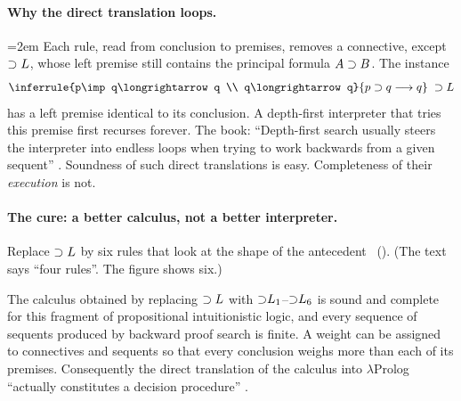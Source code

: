 \paragraph{Why the direct translation loops.}
{\emergencystretch=2em Each rule, read from conclusion to premises, removes a connective, except $\supset L$, whose left premise
still contains the principal formula $A\supset B$. The instance
\[
  \inferrule{p\imp q\longrightarrow q \\ q\longrightarrow q}{p\imp q\longrightarrow q}\;\imp L
\]
has a left premise identical to its conclusion. A depth-first interpreter that tries this premise first
recurses forever. The book: ``Depth-first search usually steers the interpreter into endless loops when
trying to work backwards from a given sequent'' . Soundness of such direct translations is
easy. Completeness of their \emph{execution} is not.\par}

\paragraph{The cure: a better calculus, not a better interpreter.}
Replace $\supset L$ by six rules that look at the shape of the antecedent~\cite{Dyckhoff1992,Hudelmaier1992}
(). (The text says ``four rules''. The figure shows six.)

\begin{fullwidth}
\end{fullwidth}

\begin{theorem}\label{thm:apps-dyckhoff}
The calculus obtained by replacing $\supset L$ with ${\supset}L_1$--${\supset}L_6$ is sound and complete for this
fragment of propositional intuitionistic logic, and every sequence of sequents produced by backward proof
search is finite. A weight can be assigned to connectives and sequents so that every conclusion weighs
more than each of its premises. Consequently the direct translation of the calculus into $\lambda$Prolog
``actually constitutes a decision procedure'' .
\end{theorem}

